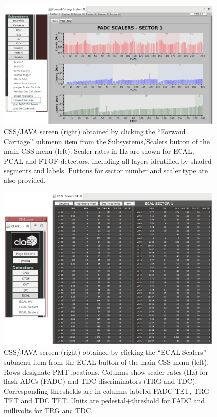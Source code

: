 \documentclass[letterpaper,10pt]{article}
\begin{document}
\begin{figure}[htbp]
  \centering
  \includegraphics[width= 7in, keepaspectratio = true]{css0}
  \vspace{2mm}
  \caption{CSS/JAVA screen (right) obtained by clicking the ``Forward Carriage'' submenu item from the Subsystems/Scalers button of the main CSS menu (left).  Scaler rates in Hz are shown for ECAL, PCAL and FTOF detectors, including all layers identified by shaded segments and labels.  Buttons for sector number and scaler type are also provided.}
\label{css0}
\end{figure}
\begin{figure}[htbp]
  \centering
  \includegraphics[width= 7in, keepaspectratio = true]{css1}
  \vspace{2mm}
  \caption{CSS/JAVA screen (right) obtained by clicking the ``ECAL Scalers'' submenu item from the ECAL button of the main CSS menu (left).  Rows designate PMT locations.  Columns show scaler rates (Hz) for flash ADCs (FADC) and TDC discriminators (TRG and TDC).  Corresponding thresholds are in columns labeled FADC TET, TRG TET and TDC TET.  Units are pedestal+threshold for FADC and millivolts for TRG and TDC.}
\label{css1}
\end{figure}
\end{document}
